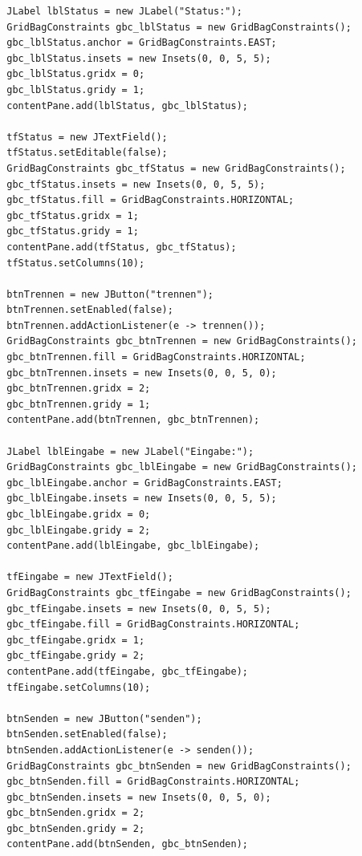 \begin{lstlisting}
        JLabel lblStatus = new JLabel("Status:");
        GridBagConstraints gbc_lblStatus = new GridBagConstraints();
        gbc_lblStatus.anchor = GridBagConstraints.EAST;
        gbc_lblStatus.insets = new Insets(0, 0, 5, 5);
        gbc_lblStatus.gridx = 0;
        gbc_lblStatus.gridy = 1;
        contentPane.add(lblStatus, gbc_lblStatus);

        tfStatus = new JTextField();
        tfStatus.setEditable(false);
        GridBagConstraints gbc_tfStatus = new GridBagConstraints();
        gbc_tfStatus.insets = new Insets(0, 0, 5, 5);
        gbc_tfStatus.fill = GridBagConstraints.HORIZONTAL;
        gbc_tfStatus.gridx = 1;
        gbc_tfStatus.gridy = 1;
        contentPane.add(tfStatus, gbc_tfStatus);
        tfStatus.setColumns(10);

        btnTrennen = new JButton("trennen");
        btnTrennen.setEnabled(false);
        btnTrennen.addActionListener(e -> trennen());
        GridBagConstraints gbc_btnTrennen = new GridBagConstraints();
        gbc_btnTrennen.fill = GridBagConstraints.HORIZONTAL;
        gbc_btnTrennen.insets = new Insets(0, 0, 5, 0);
        gbc_btnTrennen.gridx = 2;
        gbc_btnTrennen.gridy = 1;
        contentPane.add(btnTrennen, gbc_btnTrennen);

        JLabel lblEingabe = new JLabel("Eingabe:");
        GridBagConstraints gbc_lblEingabe = new GridBagConstraints();
        gbc_lblEingabe.anchor = GridBagConstraints.EAST;
        gbc_lblEingabe.insets = new Insets(0, 0, 5, 5);
        gbc_lblEingabe.gridx = 0;
        gbc_lblEingabe.gridy = 2;
        contentPane.add(lblEingabe, gbc_lblEingabe);

        tfEingabe = new JTextField();
        GridBagConstraints gbc_tfEingabe = new GridBagConstraints();
        gbc_tfEingabe.insets = new Insets(0, 0, 5, 5);
        gbc_tfEingabe.fill = GridBagConstraints.HORIZONTAL;
        gbc_tfEingabe.gridx = 1;
        gbc_tfEingabe.gridy = 2;
        contentPane.add(tfEingabe, gbc_tfEingabe);
        tfEingabe.setColumns(10);

        btnSenden = new JButton("senden");
        btnSenden.setEnabled(false);
        btnSenden.addActionListener(e -> senden());
        GridBagConstraints gbc_btnSenden = new GridBagConstraints();
        gbc_btnSenden.fill = GridBagConstraints.HORIZONTAL;
        gbc_btnSenden.insets = new Insets(0, 0, 5, 0);
        gbc_btnSenden.gridx = 2;
        gbc_btnSenden.gridy = 2;
        contentPane.add(btnSenden, gbc_btnSenden);


\end{lstlisting}

